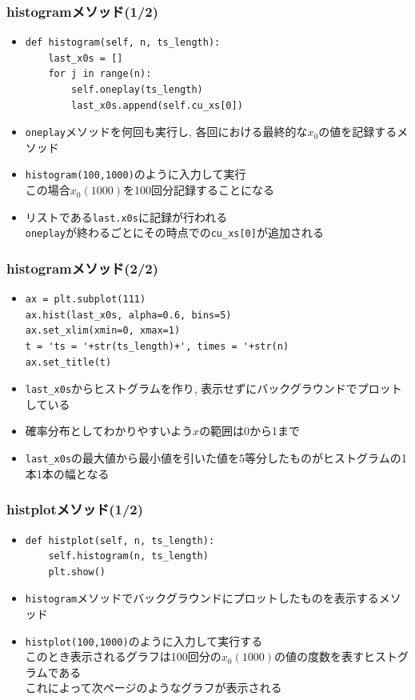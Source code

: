 \documentclass[dvipdfmx,fleqn,handout]{beamer}
\begin{document}
\begin{frame}[fragile]%
\frametitle{histogramメソッド(1/2)}
\begin{itemize}\setlength{\parskip}{0.5em}
\item
\footnotesize
\begin{verbatim}
def histogram(self, n, ts_length):
    last_x0s = []
    for j in range(n):
        self.oneplay(ts_length)
        last_x0s.append(self.cu_xs[0])
\end{verbatim}\pause
\normalsize
\item
\verb|oneplay|メソッドを何回も実行し, 各回における最終的な$x_0$の値を記録するメソッド
\pause
\item
\verb|histogram(100,1000)|のように入力して実行\pause\\
この場合$x_0(1000)$を100回分記録することになる
\pause
\item
リストである\verb|last.x0s|に記録が行われる\pause\\
\verb|oneplay|が終わるごとにその時点での\verb|cu_xs[0]|が追加される
\end{itemize}
\end{frame}


\begin{frame}[fragile]%
\frametitle{histogramメソッド(2/2)}
\begin{itemize}\setlength{\parskip}{0.5em}
\item
\footnotesize
\begin{verbatim}
ax = plt.subplot(111)
ax.hist(last_x0s, alpha=0.6, bins=5)
ax.set_xlim(xmin=0, xmax=1)
t = 'ts = '+str(ts_length)+', times = '+str(n)
ax.set_title(t)
\end{verbatim}\pause
\normalsize
\pause
\item
\verb|last_x0s|からヒストグラムを作り, 表示せずにバックグラウンドでプロットしている
\pause
\item
確率分布としてわかりやすいよう$x$の範囲は0から1まで
\item
\verb|last_x0s|の最大値から最小値を引いた値を5等分したものがヒストグラムの1本1本の幅となる
\end{itemize}
\end{frame}


\begin{frame}[fragile]%
\frametitle{histplotメソッド(1/2)}
\begin{itemize}\setlength{\parskip}{0.5em}
\item
\footnotesize
\begin{verbatim}
def histplot(self, n, ts_length):
    self.histogram(n, ts_length)
    plt.show()
\end{verbatim}
\normalsize
\pause
\item
\verb|histogram|メソッドでバックグラウンドにプロットしたものを表示するメソッド
\item
\verb|histplot(100,1000)|のように入力して実行する\pause\\
このとき表示されるグラフは100回分の$x_0(1000)$の値の度数を表すヒストグラムである
\pause
\\
これによって次ページのようなグラフが表示される
\end{itemize}
\end{frame}
\end{document}

